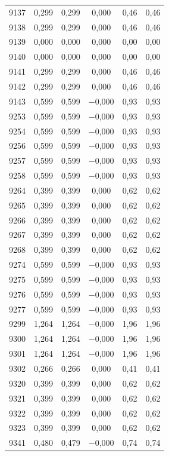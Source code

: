 \begin{longtable}{lccccc}
9137 & 0,299 & 0,299 & 0,000 & 0,46 & 0,46 \\
9138 & 0,299 & 0,299 & 0,000 & 0,46 & 0,46 \\
9139 & 0,000 & 0,000 & 0,000 & 0,00 & 0,00 \\
9140 & 0,000 & 0,000 & 0,000 & 0,00 & 0,00 \\
9141 & 0,299 & 0,299 & 0,000 & 0,46 & 0,46 \\
9142 & 0,299 & 0,299 & 0,000 & 0,46 & 0,46 \\
9143 & 0,599 & 0,599 & $-$0,000 & 0,93 & 0,93 \\
9253 & 0,599 & 0,599 & $-$0,000 & 0,93 & 0,93 \\
9254 & 0,599 & 0,599 & $-$0,000 & 0,93 & 0,93 \\
9256 & 0,599 & 0,599 & $-$0,000 & 0,93 & 0,93 \\
9257 & 0,599 & 0,599 & $-$0,000 & 0,93 & 0,93 \\
9258 & 0,599 & 0,599 & $-$0,000 & 0,93 & 0,93 \\
9264 & 0,399 & 0,399 & 0,000 & 0,62 & 0,62 \\
9265 & 0,399 & 0,399 & 0,000 & 0,62 & 0,62 \\
9266 & 0,399 & 0,399 & 0,000 & 0,62 & 0,62 \\
9267 & 0,399 & 0,399 & 0,000 & 0,62 & 0,62 \\
9268 & 0,399 & 0,399 & 0,000 & 0,62 & 0,62 \\
9274 & 0,599 & 0,599 & $-$0,000 & 0,93 & 0,93 \\
9275 & 0,599 & 0,599 & $-$0,000 & 0,93 & 0,93 \\
9276 & 0,599 & 0,599 & $-$0,000 & 0,93 & 0,93 \\
9277 & 0,599 & 0,599 & $-$0,000 & 0,93 & 0,93 \\
9299 & 1,264 & 1,264 & $-$0,000 & 1,96 & 1,96 \\
9300 & 1,264 & 1,264 & $-$0,000 & 1,96 & 1,96 \\
9301 & 1,264 & 1,264 & $-$0,000 & 1,96 & 1,96 \\
9302 & 0,266 & 0,266 & 0,000 & 0,41 & 0,41 \\
9320 & 0,399 & 0,399 & 0,000 & 0,62 & 0,62 \\
9321 & 0,399 & 0,399 & 0,000 & 0,62 & 0,62 \\
9322 & 0,399 & 0,399 & 0,000 & 0,62 & 0,62 \\
9323 & 0,399 & 0,399 & 0,000 & 0,62 & 0,62 \\
9341 & 0,480 & 0,479 & $-$0,000 & 0,74 & 0,74 \\

\end{longtable}
